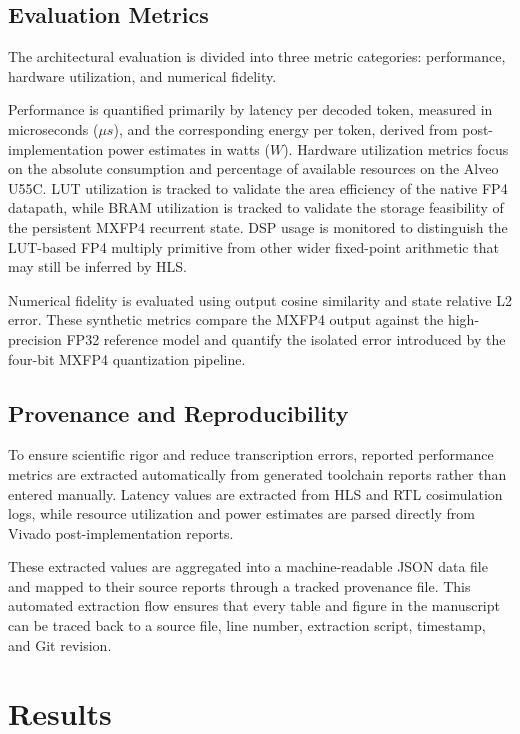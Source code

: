 ﻿\documentclass[conference]{IEEEtran}
\begin{document}
\subsection{Evaluation Metrics}
The architectural evaluation is divided into three metric categories: performance, hardware utilization, and numerical fidelity.

Performance is quantified primarily by latency per decoded token, measured in microseconds ($\mu s$), and the corresponding energy per token, derived from post-implementation power estimates in watts ($W$). Hardware utilization metrics focus on the absolute consumption and percentage of available resources on the Alveo U55C. LUT utilization is tracked to validate the area efficiency of the native FP4 datapath, while BRAM utilization is tracked to validate the storage feasibility of the persistent MXFP4 recurrent state. DSP usage is monitored to distinguish the LUT-based FP4 multiply primitive from other wider fixed-point arithmetic that may still be inferred by HLS.

Numerical fidelity is evaluated using output cosine similarity and state relative L2 error. These synthetic metrics compare the MXFP4 output against the high-precision FP32 reference model and quantify the isolated error introduced by the four-bit MXFP4 quantization pipeline.

\subsection{Provenance and Reproducibility}
To ensure scientific rigor and reduce transcription errors, reported performance metrics are extracted automatically from generated toolchain reports rather than entered manually. Latency values are extracted from HLS and RTL cosimulation logs, while resource utilization and power estimates are parsed directly from Vivado post-implementation reports.

These extracted values are aggregated into a machine-readable JSON data file and mapped to their source reports through a tracked provenance file. This automated extraction flow ensures that every table and figure in the manuscript can be traced back to a source file, line number, extraction script, timestamp, and Git revision.

\section{Results}
\end{document}
